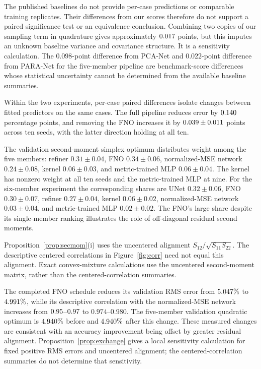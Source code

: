 The published baselines do not provide per-case predictions or comparable
training replicates. Their differences from our scores therefore do not
support a paired significance test or an equivalence conclusion. Combining
two copies of our sampling term in quadrature gives approximately
$0.017$ points, but this imputes an unknown baseline variance and
covariance structure. It is a sensitivity calculation. The $0.098$-point difference from PCA-Net
and $0.022$-point difference from PARA-Net for the five-member pipeline are
benchmark-score differences whose statistical uncertainty cannot be
determined from the available baseline summaries.

Within the two experiments, per-case paired differences isolate changes
between fitted predictors on the same cases. The full pipeline reduces error by
$0.140$ percentage points, and removing the FNO increases it by
$0.039\pm0.011$ points across ten seeds, with the latter direction
holding at all ten.

The validation second-moment simplex optimum distributes weight among the
five members: refiner $0.31\pm0.04$, FNO $0.34\pm0.06$, normalized-MSE network
$0.24\pm0.08$, kernel $0.06\pm0.03$, and metric-trained MLP $0.06\pm0.04$.
The kernel has nonzero weight at all ten seeds and the metric-trained MLP at
nine. For the six-member experiment the corresponding shares are UNet
$0.32\pm0.06$, FNO $0.30\pm0.07$, refiner $0.27\pm0.04$, kernel
$0.06\pm0.02$, normalized-MSE network $0.03\pm0.04$, and metric-trained MLP
$0.02\pm0.02$. The FNO's large share despite its single-member ranking
illustrates the role of off-diagonal residual second moments.

Proposition~\ref{prop:secmom}(i) uses the uncentered alignment
$S_{12}/\sqrt{S_{11}S_{22}}$. The descriptive centered correlations in
Figure~\ref{fig:corr} need not equal this alignment. Exact convex-mixture
calculations use the uncentered second-moment matrix, rather than the
centered-correlation summaries.

The completed FNO schedule reduces its validation RMS error from $5.047\%$ to
$4.991\%$, while its descriptive correlation with the normalized-MSE
network increases from $0.95$--$0.97$ to $0.974$--$0.980$.
The five-member validation quadratic optimum is $4.940\%$ before
and $4.940\%$ after this change. These measured changes are consistent with an accuracy
improvement being offset by greater residual alignment.
Proposition~\ref{prop:exchange} gives a local sensitivity calculation for
fixed positive RMS errors and uncentered alignment; the centered-correlation
summaries do not determine that sensitivity.

